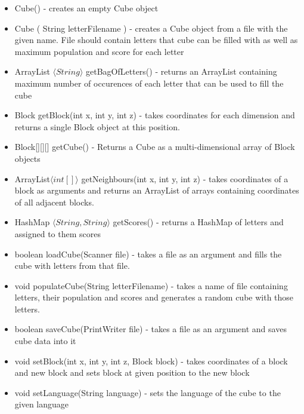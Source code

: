         \begin{itemize}
        \item  Cube() - creates an empty Cube object
\item  Cube ( String letterFilename ) - creates a Cube object from a file with the given name. File should contain letters that cube can be filled with as well as maximum population and score for each letter
\item  ArrayList $\langle String\rangle$ getBagOfLetters() - returns an ArrayList containing maximum number of occurences of each letter that can be used to fill the cube
\item  Block getBlock(int x, int y, int z) - takes coordinates for each dimension and returns a single Block object at this position.
\item  Block[][][] getCube() - Returns a Cube as a multi-dimensional array of Block objects
\item  ArrayList$\langle int[ ] \rangle$ getNeighbours(int x, int y, int z) - takes coordinates of a block as arguments and returns an ArrayList of arrays containing coordinates of all adjacent blocks.
\item  HashMap $\langle String, String \rangle$ getScores() - returns a HashMap of letters and assigned to them scores
\item  boolean loadCube(Scanner file) - takes a file as an argument and fills the cube with letters from that file.
\item  void populateCube(String letterFilename) - takes a name of file containing letters, their population and scores and generates a random cube with those letters.
\item  boolean saveCube(PrintWriter file) - takes a file as an argument and saves cube data into it
\item  void setBlock(int x, int y, int z, Block block) - takes coordinates of a block and new block and sets block at given position to the new block
\item  void setLanguage(String language) - sets the language of the cube to the given language

        \end{itemize}
